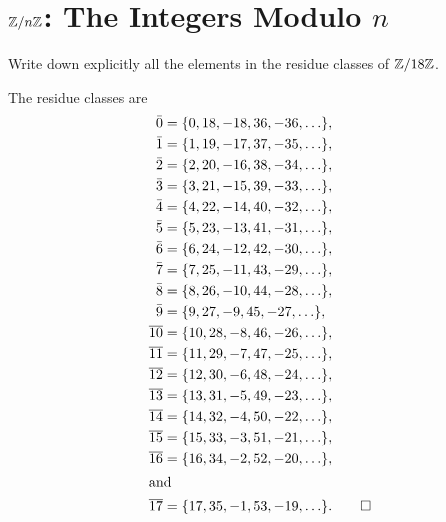 \section{\texorpdfstring{$\mathbb{Z}/n\mathbb{Z}$}{Z/nZ}: The
  Integers Modulo \texorpdfstring{$n$}{n}}

 Write down explicitly all the elements in the residue
classes of $\mathbb{Z}/18\mathbb{Z}$.
\begin{solution}
  The residue classes are
  \begin{align*}
    \bar{0} &= \{0, 18, -18, 36, -36, \ldots\}, \\
    \bar{1} &= \{1, 19, -17, 37, -35, \ldots\}, \\
    \bar{2} &= \{2, 20, -16, 38, -34, \ldots\}, \\
    \bar{3} &= \{3, 21, -15, 39, -33, \ldots\}, \\
    \bar{4} &= \{4, 22, -14, 40, -32, \ldots\}, \\
    \bar{5} &= \{5, 23, -13, 41, -31, \ldots\}, \\
    \bar{6} &= \{6, 24, -12, 42, -30, \ldots\}, \\
    \bar{7} &= \{7, 25, -11, 43, -29, \ldots\}, \\
    \bar{8} &= \{8, 26, -10, 44, -28, \ldots\}, \\
    \bar{9} &= \{9, 27, -9, 45, -27, \ldots\}, \\
    \overline{10} &= \{10, 28, -8, 46, -26, \ldots\}, \\
    \overline{11} &= \{11, 29, -7, 47, -25, \ldots\}, \\
    \overline{12} &= \{12, 30, -6, 48, -24, \ldots\}, \\
    \overline{13} &= \{13, 31, -5, 49, -23, \ldots\}, \\
    \overline{14} &= \{14, 32, -4, 50, -22, \ldots\}, \\
    \overline{15} &= \{15, 33, -3, 51, -21, \ldots\}, \\
    \overline{16} &= \{16, 34, -2, 52, -20, \ldots\}, \\
    \intertext{and}
    \overline{17} &= \{17, 35, -1, 53, -19, \ldots\}. \qedhere
  \end{align*}
\end{solution}

